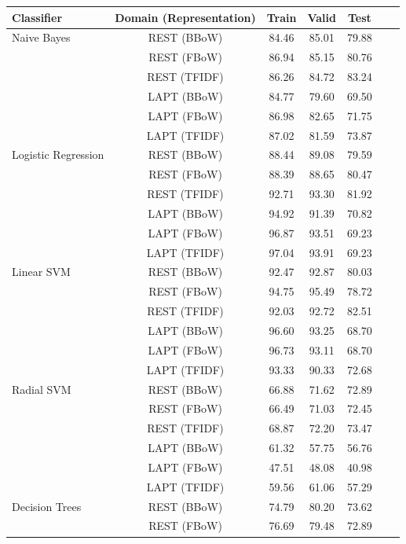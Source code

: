 \documentclass[comsoc,conference]{IEEEtran}
\begin{document}
\begin{table}[!htb]
\begin{tabularx}{\textwidth}{@{}l*{5}{C}c@{}}
\toprule
Classifier & Domain (Representation) & Train & Valid & Test \\ 
\midrule
Naive Bayes
& REST (BBoW)      & 84.46 & 85.01 & 79.88 \\
& REST (FBoW)      & 86.94 & 85.15 & 80.76 \\
& REST (TFIDF)     & 86.26 & 84.72 & 83.24 \\
& LAPT (BBoW)          & 84.77 & 79.60 & 69.50 \\
& LAPT (FBoW)          & 86.98 & 82.65 & 71.75 \\
& LAPT (TFIDF)         & 87.02 & 81.59 & 73.87 \\
\midrule
Logistic Regression
& REST (BBoW)      & 88.44 & 89.08 & 79.59 \\
& REST (FBoW)      & 88.39 & 88.65 & 80.47 \\
& REST (TFIDF)     & 92.71 & 93.30 & 81.92 \\
& LAPT (BBoW)          & 94.92 & 91.39 & 70.82 \\
& LAPT (FBoW)          & 96.87 & 93.51 & 69.23 \\
& LAPT (TFIDF)         & 97.04 & 93.91 & 69.23 \\
\midrule
Linear SVM
& REST (BBoW)      & 92.47 & 92.87 & 80.03 \\
& REST (FBoW)      & 94.75 & 95.49 & 78.72 \\
& REST (TFIDF)     & 92.03 & 92.72 & 82.51 \\
& LAPT (BBoW)          & 96.60 & 93.25 & 68.70 \\
& LAPT (FBoW)          & 96.73 & 93.11 & 68.70 \\
& LAPT (TFIDF)         & 93.33 & 90.33 & 72.68 \\
\midrule
Radial SVM
& REST (BBoW)      & 66.88 & 71.62 & 72.89 \\
& REST (FBoW)      & 66.49 & 71.03 & 72.45 \\
& REST (TFIDF)     & 68.87 & 72.20 & 73.47 \\
& LAPT (BBoW)          & 61.32 & 57.75 & 56.76 \\
& LAPT (FBoW)          & 47.51 & 48.08 & 40.98 \\
& LAPT (TFIDF)         & 59.56 & 61.06 & 57.29 \\
\midrule
Decision Trees
& REST (BBoW)      & 74.79 & 80.20 & 73.62 \\
& REST (FBoW)      & 76.69 & 79.48 & 72.89 \\

\end{tabularx}
\end{table}
\end{document}
